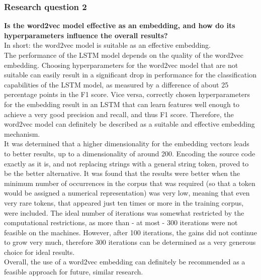 \documentclass[
a4paper,
pagesize,
pdftex,
12pt,
twoside, %
BCOR=5mm, %
ngerman,
fleqn,
final,
]{scrartcl}
\begin{document}
	\subsubsection{Research question 2}
	\textbf{Is the word2vec model effective as an embedding, and how do its hyperparameters influence the overall results?}\\
	In short: the word2vec model is suitable as an effective embedding.\\
	The performance of the LSTM model depends on the quality of the word2vec embedding. Choosing hyperparameters for the word2vec model that are not suitable can easily result in a significant drop in performance for the classification capabilities of the LSTM model, as measured by a difference of about 25 percentage points in the F1 score. Vice versa, correctly chosen hyperparameters for the embedding result in an LSTM that can learn features well enough to achieve a very good precision and recall, and thus F1 score. Therefore, the word2vec model can definitely be described as a suitable and effective embedding mechanism.\\
	It was determined that a higher dimensionality for the embedding vectors leads to better results, up to a dimensionality of around 200. Encoding the source code exactly as it is, and not replacing strings with a general string token, proved to be the better alternative. It was found that the results were better when the minimum number of occurrences in the corpus that was required (so that a token would be assigned a numerical representation) was very low, meaning that even very rare tokens, that appeared just ten times or more in the training corpus, were included. The ideal number of iterations was somewhat restricted by the computational restrictions, as more than - at most - 300 iterations were not feasible on the machines. However, after 100 iterations, the gains did not continue to grow very much, therefore 300 iterations can be determined as a very generous choice for ideal results.\\
	Overall, the use of a word2vec embedding can definitely be recommended as a feasible approach for future, similar research. 
	
\end{document}
